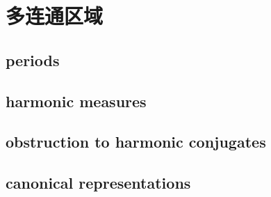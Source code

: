 \section{多连通区域}
\label{b3:sec:1705}


\subsection{periods}
\label{b3:subsec:170501}

\subsection{harmonic measures}
\label{b3:subsec:170502}

\subsection{obstruction to harmonic conjugates}
\label{b3:subsec:170503}

\subsection{canonical representations}
\label{b3:subsec:170504}


